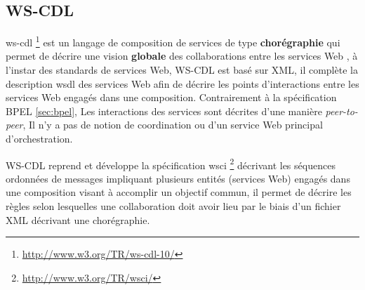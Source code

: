 
    \subsection{WS-CDL}
    \label{sec:WS-CDL}
    \acrshort{ws-cdl} \footnote{\url{http://www.w3.org/TR/ws-cdl-10/}}
    \cite{kavantzas2005web} est un langage de composition de services
    de type \textbf{chorégraphie} qui permet de décrire une vision
    \textbf{globale} des collaborations entre les services Web
    \cite{elie2010}, à l'instar des standards de services Web,
    \textsc{WS-CDL} est basé sur \textsc{XML}, il complète la
    description \acrshort{wsdl} des services Web afin de décrire les
    points d'interactions entre les services Web engagés dans une
    composition. Contrairement à la spécification \textsc{BPEL}
    \ref{sec:bpel}, Les interactions des services sont décrites d'une
    manière \textit{peer-to-peer}, Il n'y a pas de notion de
    coordination ou d'un service Web principal d'orchestration.

    \textsc{WS-CDL} reprend et développe la spécification
    \acrshort{wsci} \footnote{\url{http://www.w3.org/TR/wsci/}}
    \cite{arkin2002web} décrivant les séquences ordonnées de messages
    impliquant plusieurs entités (services Web) engagés dans une
    composition visant à accomplir un objectif commun, il permet de
    décrire les règles selon lesquelles une collaboration doit avoir
    lieu par le biais d'un fichier \textsc{XML} décrivant une
    chorégraphie.


